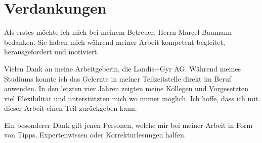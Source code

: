 \section{Verdankungen}

Als erstes möchte ich mich bei meinem Betreuer, Herrn Marcel Baumann bedanken.
Sie haben mich während meiner Arbeit kompetent begleitet, herausgefordert und motiviert.

Vielen Dank an meine Arbeitgeberin, die Landis+Gyr AG.
Während meines Studiums konnte ich das Gelernte in meiner Teilzeitstelle direkt im Beruf anwenden.
In den letzten vier Jahren zeigten meine Kollegen und Vorgesetzten viel Flexibilität und unterstützten mich wo immer möglich.
Ich hoffe, dass ich mit dieser Arbeit einen Teil zurückgeben kann.

Ein besonderer Dank gilt jenen Personen, welche mir bei meiner Arbeit in Form von Tipps, Expertenwissen oder Korrekturlesungen halfen.